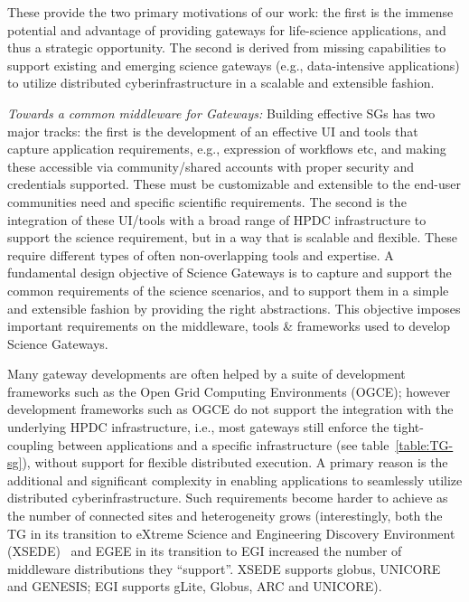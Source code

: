 \documentclass[]{svjour3}
\begin{document}
These provide the two primary motivations of our work: the first is
the immense potential and advantage of providing gateways for
life-science applications, and thus a strategic opportunity. The
second is derived from missing capabilities to support existing and
emerging science gateways (e.g., data-intensive applications) to
utilize distributed cyberinfrastructure in a scalable and extensible
fashion.



{\it Towards a common middleware for Gateways:} Building effective SGs
has two major tracks: the first is the development of an effective UI
and tools that capture application requirements, e.g., expression of
workflows etc, and making these accessible via community/shared
accounts with proper security and credentials supported. These must be
customizable and extensible to the end-user communities need and
specific scientific requirements. The second is the integration of
these UI/tools with a broad range of HPDC infrastructure to support
the science requirement, but in a way that is scalable and flexible.
These require different types of often non-overlapping tools and
expertise.  A fundamental design objective of Science Gateways is to
capture and support the common requirements of the science scenarios,
and to support them in a simple and extensible fashion by providing
the right abstractions.  This objective imposes
important %
requirements on the middleware, tools \& frameworks used to develop
Science Gateways.

Many gateway developments are often helped by a suite of development
frameworks such as the Open Grid Computing
Environments\cite{ogce-2010} (OGCE); however development frameworks
such as OGCE do not support the integration with the underlying HPDC
infrastructure, i.e., most gateways still enforce the tight-coupling
between applications and a specific infrastructure (see
table~\ref{table:TG-sg}), without support for flexible distributed
execution.  A primary reason is the additional and significant
complexity in %
enabling applications to seamlessly utilize distributed
cyberinfrastructure. Such requirements become harder to achieve as the
number of connected sites and heterogeneity grows (interestingly, both
the TG in its transition to eXtreme Science and Engineering Discovery
Environment (XSEDE)~\cite{XSEDE} and EGEE in its transition to EGI
increased the number of middleware distributions they ``support''.
XSEDE supports globus, UNICORE and GENESIS; EGI supports gLite,
Globus, ARC and UNICORE).
\end{document}
